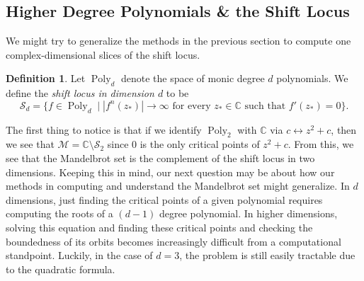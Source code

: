 \documentclass{amsart}
\newcommand{\bbC}{\mathbb{C}}
\newcommand{\cal}[1]{ \mathcal{#1}}
\newcommand{\Shift}[1]{ \mathcal{S}_{#1}}
\newcommand{\Mand}{\cal{M}}
\newcommand{\Poly}{\operatorname{Poly}}
\newcommand{\abs}[1]{ \left| #1 \right| }
\theoremstyle{definition}
\newtheorem{defn}[thm]{Definition}
\theoremstyle{remark}
\numberwithin{equation}{section}
\begin{document}


  \subsection{Higher Degree Polynomials \& the Shift Locus}
We might try to generalize the methods in the previous section to compute one complex-dimensional slices of the shift locus.

\begin{defn}\cite{demarco2011}
Let $\Poly_d$ denote the space of monic degree $d$ polynomials. We define the \emph{shift locus in dimension $d$} to be
\begin{equation}
  \Shift{d}=\{f\in \Poly_d \mid \abs{f^n(z_\ast)}\to\infty \text{ for every $z_\ast\in\bbC$ such that $f'(z_\ast)=0$} \}.
\end{equation}
\end{defn}
The first thing to notice is that if we identify $\Poly_2$ with $\bbC$ via $c\leftrightarrow z^2+c$, then we see that $\Mand=\bbC\setminus \Shift{2}$ since 0 is the only critical points of $z^2+c$. From this, we see that the Mandelbrot set is the complement of the shift locus in two dimensions. Keeping this in mind, our next question may be about how our methods in computing and understand the Mandelbrot set might generalize. In $d$ dimensions, just finding the critical points of a given polynomial requires computing the roots of a $(d-1)$ degree polynomial. In higher dimensions, solving this equation and finding these critical points and checking the boundedness of its orbits becomes increasingly difficult from a computational standpoint. Luckily, in the case of $d=3$, the problem is still easily tractable due to the quadratic formula.\\
\end{document}

